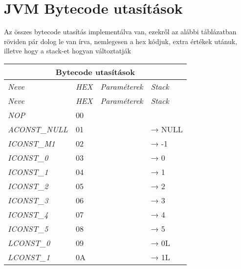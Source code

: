 \section{JVM Bytecode utasítások}

Az összes bytecode utasítás implementálva van, ezekről az alábbi táblázatban röviden pár dolog le van írva, nemlegesen a hex kódjuk, extra értékek utánuk, illetve hogy a stack-et hogyan változtatják
\begin{center}
	\begin{longtable}{ | p{} | p{} | p{} | p{} | }
		
		\hline
		\multicolumn{4}{|c|}{\textbf{Bytecode utasítások}}
		\\ \hline
		
		\emph{Neve} & \emph{HEX} & \emph{Paraméterek} & \emph{Stack}
		\\ \hline \hline 
		\endfirsthead %
		
		\hline
		\emph{Neve} & \emph{HEX} & \emph{Paraméterek} & \emph{Stack}
		\\ \hline \hline
		\endhead %
		
        \emph{NOP}
		& 00 & &
		\\ \hline

		\emph{ACONST\_NULL}
		& 01 & & → NULL
		\\ \hline
		
		\emph{ICONST\_M1}
		& 02 & & → -1
		\\ \hline
		
		\emph{ICONST\_0}
		& 03 & & → 0
		\\ \hline

        \emph{ICONST\_1}
		& 04 & & → 1
		\\ \hline

        \emph{ICONST\_2}
		& 05 & & → 2
		\\ \hline

        \emph{ICONST\_3}
		& 06 & & → 3
		\\ \hline

        \emph{ICONST\_4}
		& 07 & & → 4
		\\ \hline

        \emph{ICONST\_5}
		& 08 & & → 5
		\\ \hline

        \emph{LCONST\_0}
		& 09 & & → 0L
		\\ \hline

        \emph{LCONST\_1}
		& 0A & & → 1L
		\\ \hline
		

\end{longtable}
\end{center}
